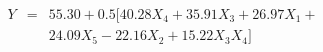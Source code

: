 

\begin{eqnarray*}
Y & = & 55.30 + 0.5 [40.28 X_4 + 35.91 X_3 + 26.97 X_1 + \\
  &   & 24.09 X_5 - 22.16 X_2 + 15.22 X_3 X_4]

\end{eqnarray*}


